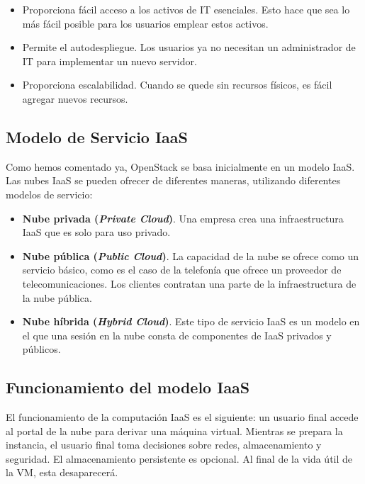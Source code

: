 \begin{itemize}
\item Proporciona fácil acceso a los activos de IT esenciales. Esto hace que sea lo más fácil posible para los usuarios emplear estos activos.
\end{itemize}

\begin{itemize}
\item Permite el autodespliegue. Los usuarios ya no necesitan un administrador de IT para implementar un nuevo servidor.
\end{itemize}

\begin{itemize}
\item Proporciona escalabilidad. Cuando se quede sin recursos físicos, es fácil agregar nuevos recursos.
\end{itemize}

\subsection{Modelo de Servicio IaaS}
Como hemos comentado ya, OpenStack se basa inicialmente en un modelo IaaS. Las nubes IaaS se pueden ofrecer de diferentes maneras, utilizando diferentes modelos de servicio:


\begin{itemize}
\item \textbf{Nube privada (\textit{Private Cloud})}. Una empresa crea una infraestructura IaaS que es solo para uso privado.
\end{itemize}

\begin{itemize}
\item \textbf{Nube pública (\textit{Public Cloud})}. La capacidad de la nube se ofrece como un servicio básico, como es el caso de la telefonía que ofrece un proveedor de telecomunicaciones. Los clientes contratan una parte de la infraestructura de la nube pública.
\end{itemize}

\begin{itemize}
\item \textbf{Nube híbrida (\textit{Hybrid Cloud})}. Este tipo de servicio IaaS es un modelo en el que una sesión en la nube consta de componentes de IaaS privados y públicos.
\end{itemize}

\subsection{Funcionamiento del modelo IaaS}
El funcionamiento de la computación IaaS es el siguiente: un usuario final accede al portal de la nube para derivar una máquina virtual. Mientras se prepara la instancia, el usuario final toma decisiones sobre redes, almacenamiento y seguridad. El almacenamiento persistente es opcional. Al final de la vida útil de la VM, esta desaparecerá. 

